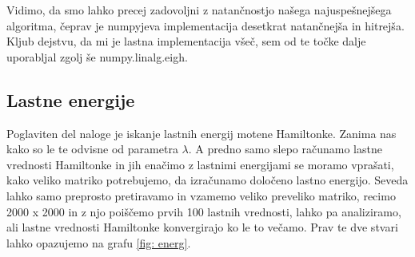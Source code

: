 \documentclass[slovene,11pt,a4paper]{article}
\begin{document}
Vidimo, da smo lahko precej zadovoljni z natančnostjo našega najuspešnejšega algoritma, čeprav je numpyjeva implementacija desetkrat natančnejša in hitrejša. Kljub dejstvu, da mi je lastna implementacija všeč, sem od te točke dalje uporabljal zgolj še numpy.linalg.eigh.

\newpage

\subsection{Lastne energije}

Poglaviten del naloge je iskanje lastnih energij motene Hamiltonke. Zanima nas kako so le te odvisne od parametra $\lambda$. A predno samo slepo računamo lastne vrednosti Hamiltonke in jih enačimo z lastnimi energijami se moramo vprašati, kako veliko matriko potrebujemo, da izračunamo določeno lastno energijo. Seveda lahko samo preprosto pretiravamo in vzamemo veliko preveliko matriko, recimo 2000 x 2000 in z njo poiščemo prvih 100 lastnih vrednosti, lahko pa analiziramo, ali lastne vrednosti Hamiltonke konvergirajo ko le to večamo. Prav te dve stvari lahko opazujemo na grafu \ref{fig: energ}.
\end{document}
